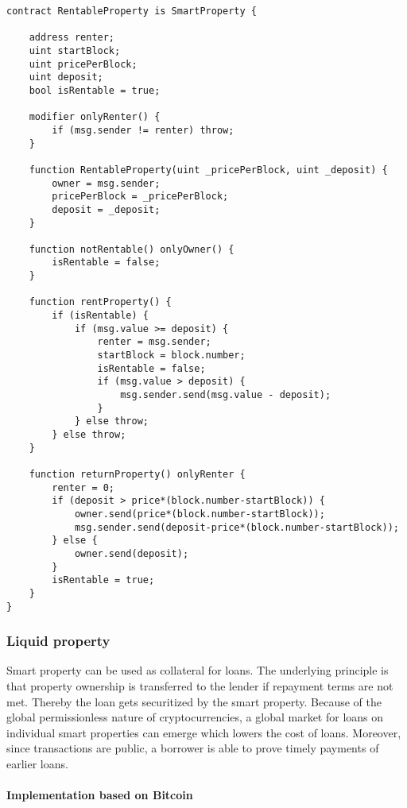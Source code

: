 \begin{lstlisting}[breaklines,basicstyle=\tiny]
contract RentableProperty is SmartProperty {
    
    address renter;
    uint startBlock;
    uint pricePerBlock;
    uint deposit;
    bool isRentable = true;
    
    modifier onlyRenter() {
        if (msg.sender != renter) throw;
    } 
    
    function RentableProperty(uint _pricePerBlock, uint _deposit) {
        owner = msg.sender;
        pricePerBlock = _pricePerBlock;
        deposit = _deposit;
    }
    
    function notRentable() onlyOwner() {
        isRentable = false;
    }
    
    function rentProperty() {
        if (isRentable) {
            if (msg.value >= deposit) {
                renter = msg.sender;
                startBlock = block.number;
                isRentable = false;
                if (msg.value > deposit) {
                    msg.sender.send(msg.value - deposit);
                }
            } else throw;
        } else throw;
    }
    
    function returnProperty() onlyRenter {
        renter = 0;
        if (deposit > price*(block.number-startBlock)) {
            owner.send(price*(block.number-startBlock));
            msg.sender.send(deposit-price*(block.number-startBlock));
        } else {
            owner.send(deposit);
        }
        isRentable = true;
    }
}
\end{lstlisting}

\subsubsection{Liquid property}

Smart property can be used as collateral for loans. The underlying principle is that property ownership is transferred to the lender if repayment terms are not met. Thereby the loan gets securitized by the smart property. Because of the global permissionless nature of cryptocurrencies, a global market for loans on individual smart properties can emerge which lowers the cost of loans. Moreover, since transactions are public, a borrower is able to prove timely payments of earlier loans. 

\paragraph{Implementation based on Bitcoin}

